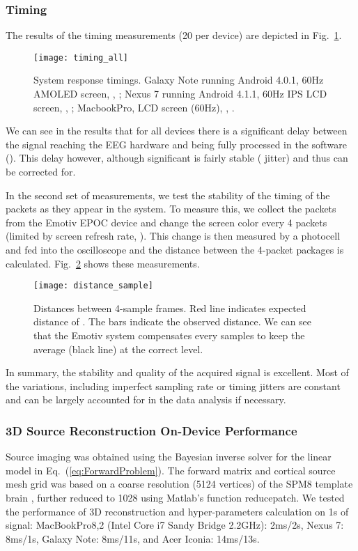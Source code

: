 \documentclass[10pt]{article}
\begin{document}
\begin{center}
\subsubsection{Timing}
The results of the timing measurements (20 per device) are depicted in Fig.~\ref{figure_timing_all}.
\begin{figure}[!t]
\centering
\texttt{[image: timing\_all]}
\caption{System response timings. Galaxy Note running Android 4.0.1, 60Hz AMOLED screen, , ; Nexus 7 running Android 4.1.1, 60Hz IPS LCD screen, , ; MacbookPro, LCD screen (60Hz), , .}
\label{figure_timing_all}
\end{figure}
We can see in the results that for all devices there is a significant delay between the signal reaching the EEG hardware and being fully processed in the software (). This delay however, although significant is fairly stable ( jitter) and thus can be corrected for.

In the second set of measurements, we test the stability of the timing of the packets as they appear in the system. To measure this, we collect the packets from the Emotiv EPOC device and change the screen color every 4 packets (limited by screen refresh rate, ). This change is then measured by a photocell and fed into the oscilloscope and the distance between the 4-packet packages is calculated. Fig.~\ref{figure_distance_4} shows these measurements.
\begin{figure}[!t]
\centering
\texttt{[image: distance\_sample]}
\caption{Distances between 4-sample frames. Red line indicates expected distance of . The bars indicate the observed distance. We can see that the Emotiv system compensates every  samples to keep the average (black line) at the correct level.}
\label{figure_distance_4}
\end{figure}
In summary, the stability and quality of the acquired signal is excellent. Most of the variations, including imperfect sampling rate or timing jitters are constant and can be largely accounted for in the data analysis if necessary.


		\subsubsection{3D Source Reconstruction On-Device Performance}
 
Source imaging was obtained using the Bayesian inverse solver for the linear model in Eq.\ (\ref{eq:ForwardProblem}). The forward matrix  and cortical source mesh grid was based on a coarse resolution (5124 vertices) of the SPM8 template brain \cite{litvak2011eeg}, further reduced to 1028 using Matlab's function reducepatch. We tested the performance of 3D reconstruction and hyper-parameters calculation on 1s of signal: MacBookPro8,2 (Intel Core i7 Sandy Bridge 2.2GHz): 2ms/2s, Nexus 7: 8ms/1s, Galaxy Note: 8ms/11s, and Acer Iconia: 14ms/13s.


\end{center}
\end{document}
